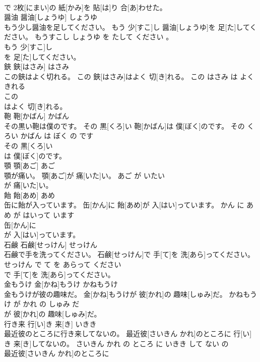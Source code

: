 \documentclass[8pt]{extreport}
\begin{document}
\begin{CJK}{UTF8}{min}
\\	で 2枚[にまい]の 紙[かみ]を 貼[は]り 合[あ]わせた。			
\\	醤油	醤油[しょうゆ]	しょうゆ	
\\	もう少し醤油を足してください。	もう 少[すこ]し 醤油[しょうゆ]を 足[た]してください。	もうすこし しょうゆ を たして ください 。	
\\	もう 少[すこ]し
\\	を 足[た]してください。			
\\	鋏	鋏[はさみ]	はさみ	
\\	この鋏はよく切れる。	この 鋏[はさみ]はよく 切[き]れる。	この はさみ は よく きれる	
\\	この
\\	はよく 切[き]れる。			
\\	鞄	鞄[かばん]	かばん	
\\	その黒い鞄は僕のです。	その 黒[くろ]い 鞄[かばん]は 僕[ぼく]のです。	その くろい かばん は ぼく の です	
\\	その 黒[くろ]い
\\	は 僕[ぼく]のです。			
\\	顎	顎[あご]	あご	
\\	顎が痛い。	顎[あご]が 痛[いた]い。	あご が いたい	
\\	が 痛[いた]い。			
\\	飴	飴[あめ]	あめ	
\\	缶に飴が入っています。	缶[かん]に 飴[あめ]が 入[はい]っています。	かん に あめ が はいって います	
\\	缶[かん]に
\\	が 入[はい]っています。			
\\	石鹸	石鹸[せっけん]	せっけん	
\\	石鹸で手を洗ってください。	石鹸[せっけん]で 手[て]を 洗[あら]ってください。	せっけん で て を あらって ください	
\\	で 手[て]を 洗[あら]ってください。			
\\	金もうけ	金[かね]もうけ	かねもうけ	
\\	金もうけが彼の趣味だ。	金[かね]もうけが 彼[かれ]の 趣味[しゅみ]だ。	かねもうけ が かれ の しゅみ だ	
\\	が 彼[かれ]の 趣味[しゅみ]だ。			
\\	行き来	行[い]き 来[き]	いきき	
\\	最近彼のところに行き来してないの。	最近彼[さいきん かれ]のところに 行[い]き 来[き]してないの。	さいきん かれ の ところ に いきき して ない の	
\\	最近彼[さいきん かれ]のところに

\end{CJK}
\end{document}
